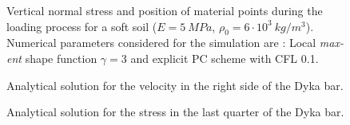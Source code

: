 \documentclass{article}
\begin{document}
\begin{figure}
{    \label{fig:Block-LME3-PCE-t1}
  }
  \caption{Vertical normal stress and position of material points
    during the loading process for a soft soil ($E = 5\ MPa$, $\rho_0
    = 6\cdot 10^3\ kg/m^3$). Numerical parameters considered for the
    simulation are : Local \textit{max-ent} shape function $\gamma =3$
    and explicit PC scheme with CFL 0.1.}
  \label{fig:Block-LME3}
\end{figure}


\begin{figure}\sidecaption
  \centering
  \caption[Velocities values in the right side of the Dyka
  bar]{Analytical solution for the velocity in the right side of the Dyka bar.}
  \label{fig:vel_analytics_dyka}
\end{figure}

\begin{figure}\sidecaption
  \centering
  \caption[Stress values in the last quarter side of the Dyka
  bar]{Analytical solution for the stress in the last quarter of the Dyka bar.}
  \label{fig:stress_analytics_dyka}
\end{figure}
\end{document}
